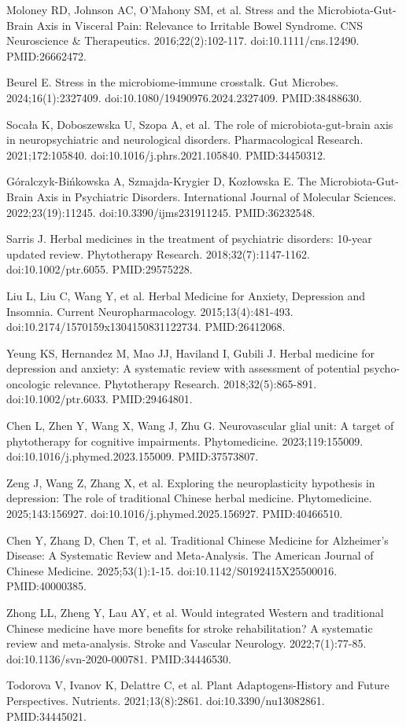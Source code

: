 \documentclass[11pt,oneside]{book}
\newcommand{\reff}[2]{\par\hangindent=7mm\hangafter=1\noindent[#1]\hspace{2mm}#2\par}
\begin{document}
\reff{34}{Moloney RD, Johnson AC, O'Mahony SM, et al. Stress and the Microbiota-Gut-Brain Axis in Visceral Pain: Relevance to Irritable Bowel Syndrome. CNS Neuroscience \& Therapeutics. 2016;22(2):102-117. doi:10.1111/cns.12490. PMID:26662472.}
\reff{35}{Beurel E. Stress in the microbiome-immune crosstalk. Gut Microbes. 2024;16(1):2327409. doi:10.1080/19490976.2024.2327409. PMID:38488630.}
\reff{36}{Socała K, Doboszewska U, Szopa A, et al. The role of microbiota-gut-brain axis in neuropsychiatric and neurological disorders. Pharmacological Research. 2021;172:105840. doi:10.1016/j.phrs.2021.105840. PMID:34450312.}
\reff{37}{Góralczyk-Bińkowska A, Szmajda-Krygier D, Kozłowska E. The Microbiota-Gut-Brain Axis in Psychiatric Disorders. International Journal of Molecular Sciences. 2022;23(19):11245. doi:10.3390/ijms231911245. PMID:36232548.}
\reff{38}{Sarris J. Herbal medicines in the treatment of psychiatric disorders: 10-year updated review. Phytotherapy Research. 2018;32(7):1147-1162. doi:10.1002/ptr.6055. PMID:29575228.}
\reff{39}{Liu L, Liu C, Wang Y, et al. Herbal Medicine for Anxiety, Depression and Insomnia. Current Neuropharmacology. 2015;13(4):481-493. doi:10.2174/1570159x1304150831122734. PMID:26412068.}
\reff{40}{Yeung KS, Hernandez M, Mao JJ, Haviland I, Gubili J. Herbal medicine for depression and anxiety: A systematic review with assessment of potential psycho-oncologic relevance. Phytotherapy Research. 2018;32(5):865-891. doi:10.1002/ptr.6033. PMID:29464801.}
\reff{41}{Chen L, Zhen Y, Wang X, Wang J, Zhu G. Neurovascular glial unit: A target of phytotherapy for cognitive impairments. Phytomedicine. 2023;119:155009. doi:10.1016/j.phymed.2023.155009. PMID:37573807.}
\reff{42}{Zeng J, Wang Z, Zhang X, et al. Exploring the neuroplasticity hypothesis in depression: The role of traditional Chinese herbal medicine. Phytomedicine. 2025;143:156927. doi:10.1016/j.phymed.2025.156927. PMID:40466510.}
\reff{43}{Chen Y, Zhang D, Chen T, et al. Traditional Chinese Medicine for Alzheimer's Disease: A Systematic Review and Meta-Analysis. The American Journal of Chinese Medicine. 2025;53(1):1-15. doi:10.1142/S0192415X25500016. PMID:40000385.}
\reff{44}{Zhong LL, Zheng Y, Lau AY, et al. Would integrated Western and traditional Chinese medicine have more benefits for stroke rehabilitation? A systematic review and meta-analysis. Stroke and Vascular Neurology. 2022;7(1):77-85. doi:10.1136/svn-2020-000781. PMID:34446530.}
\reff{45}{Todorova V, Ivanov K, Delattre C, et al. Plant Adaptogens-History and Future Perspectives. Nutrients. 2021;13(8):2861. doi:10.3390/nu13082861. PMID:34445021.}
\end{document}
